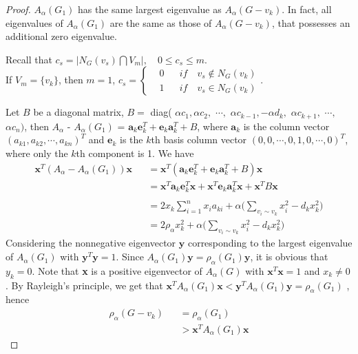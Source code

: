 \documentclass[amsthm]{elsart}
\begin{document}
\begin{proof}
$A_\alpha(G_1)$ has the same largest eigenvalue as $A_\alpha(G - v_k)$. In fact, all eigenvalues of $A_\alpha(G_1)$ are the same as those of
$A_\alpha(G - v_k)$, that possesses an additional zero eigenvalue.

Recall that $ c_s = |N_G(v_s) \bigcap V_m|, \quad 0\leqslant c_s \leqslant m$.
\\ If $V_m = \{v_k\}$, then $m = 1$,
$
c_s =
\left\{
\begin{aligned}
&0    && if \quad v_s \notin N_G(v_k) \\
&1    && if \quad v_s \in N_G(v_k)
\end{aligned}
\right.
$.

Let $B$ be a diagonal matrix, $B =$ diag(
$\alpha c_1, \alpha c_2, $ $ \cdots,$ $ \alpha c_{k-1}, - \alpha d_{k}, $ $ \alpha c_{k+1},$ $  \cdots, $ $\alpha c_n )$,
 then $A_\alpha$ - $A_\alpha(G_1)$ = $\textbf{a}_k\textbf{e}_k^T + \textbf{e}_k\textbf{a}_k^T + B$, where $\textbf{a}_k$ is the column vector $(a_{k1}, a_{k2}, \cdots , a_{kn})^T$ and $\textbf{e}_k$ is the $k$th basis column vector $(0, 0, \cdots , 0, 1, 0, \cdots , 0)^T$,
 where only the $k$th component is 1. We have
\begin{eqnarray*}
\textbf{x}^T(A_\alpha - A_\alpha(G_1))\textbf{x}
&&= \textbf{x}^T (\textbf{a}_k \textbf{e}_k^T + \textbf{e}_k \textbf{a}_k^T + B) \textbf{x}
\\ &&= \textbf{x}^T \textbf{a}_k \textbf{e}_k^T \textbf{x} + \textbf{x}^T \textbf{e}_k \textbf{a}_k^T \textbf{x} + \textbf{x}^T B \textbf{x} \\
\\ &&= 2x_k \sum \limits_{i=1}^{n}x_ia_{ki} + \alpha \big(\sum \limits_{v_i \sim v_k}^{} x_i^2 - d_k x_k^2 \big)
\\ &&= 2 \rho_\alpha x_k^2 + \alpha \big(\sum \limits_{v_i \sim v_k}^{} x_i^2 - d_k x_k^2 \big)
\end{eqnarray*}
\qquad Considering the nonnegative eigenvector $\textbf{y}$ corresponding to the largest eigenvalue of $A_\alpha(G_1)$ with $\textbf{y}^T\textbf{y} = 1$. Since $A_\alpha(G_1) \textbf{y} = \rho_\alpha(G_1) \textbf{y}$, it is obvious that $y_k = 0$. Note that \textbf{x} is a positive eigenvector of $A_\alpha(G)$ with $\textbf{x}^{T} \textbf{x} = 1$ and $x_k \neq 0$. By Rayleigh's principle, we get that  $\textbf{x}^{T}A_\alpha(G_1)\textbf{x}  < \textbf{y}^{T}A_\alpha(G_1)\textbf{y} = \rho_\alpha(G_1)$
, hence
\begin{eqnarray}
\nonumber \rho_\alpha(G - v_k)
&&= \rho_\alpha(G_1)
\\ \nonumber &&> \textbf{x}^T A_\alpha(G_1) \textbf{x}

\end{eqnarray}
\end{proof}
\end{document}
